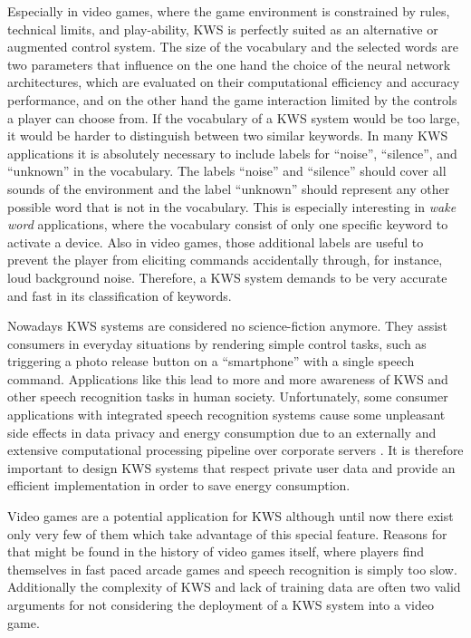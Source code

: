 Especially in video games, where the game environment is constrained by rules, technical limits, and play-ability, KWS is perfectly suited as an alternative or augmented control system.
The size of the vocabulary and the selected words are two parameters that influence on the one hand the choice of the neural network architectures, which are evaluated on their computational efficiency and accuracy performance, and on the other hand the game interaction limited by the controls a player can choose from.
If the vocabulary of a KWS system would be too large, it would be harder to distinguish between two similar keywords.
In many KWS applications it is absolutely necessary to include labels for \enquote{noise}, \enquote{silence}, and \enquote{unknown} in the vocabulary.
The labels \enquote{noise} and \enquote{silence} should cover all sounds of the environment and the label \enquote{unknown} should represent any other possible word that is not in the vocabulary.
This is especially interesting in \emph{wake word} applications, where the vocabulary consist of only one specific keyword to activate a device.
Also in video games, those additional labels are useful to prevent the player from eliciting commands accidentally through, for instance, loud background noise.
Therefore, a KWS system demands to be very accurate and fast in its classification of keywords.

Nowadays KWS systems are considered no science-fiction anymore.
They assist consumers in everyday situations by rendering simple control tasks, such as triggering a photo release button on a \enquote{smartphone} with a single speech command.
Applications like this lead to more and more awareness of KWS and other speech recognition tasks in human society.
Unfortunately, some consumer applications with integrated speech recognition systems cause some unpleasant side effects in data privacy and energy consumption due to an externally and extensive computational processing pipeline over corporate servers \cite{Tang2018}.
It is therefore important to design KWS systems that respect private user data and provide an efficient implementation in order to save energy consumption.

Video games are a potential application for KWS although until now there exist only very few of them which take advantage of this special feature.
Reasons for that might be found in the history of video games itself, where players find themselves in fast paced arcade games and speech recognition is simply too slow.
Additionally the complexity of KWS and lack of training data are often two valid arguments for not considering the deployment of a KWS system into a video game.

